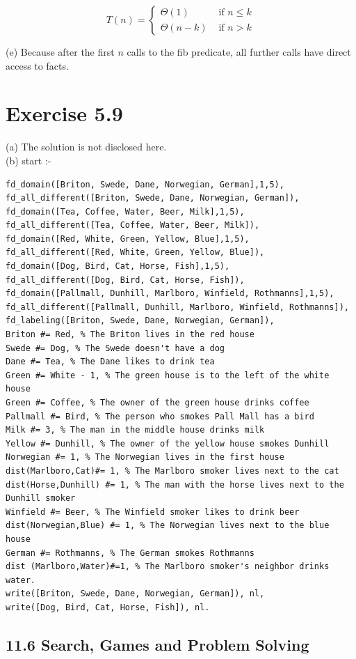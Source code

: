\documentclass[10pt]{article}
\begin{document}
$$
T(n)= \begin{cases}\Theta(1) & \text { if } n \leq k \\ \Theta(n-k) & \text { if } n>k\end{cases}
$$

(e) Because after the first $n$ calls to the fib predicate, all further calls have direct access to facts.

\section*{Exercise 5.9}
(a) The solution is not disclosed here.\\
(b) start :-

\begin{verbatim}
fd_domain([Briton, Swede, Dane, Norwegian, German],1,5),
fd_all_different([Briton, Swede, Dane, Norwegian, German]),
fd_domain([Tea, Coffee, Water, Beer, Milk],1,5),
fd_all_different([Tea, Coffee, Water, Beer, Milk]),
fd_domain([Red, White, Green, Yellow, Blue],1,5),
fd_all_different([Red, White, Green, Yellow, Blue]),
fd_domain([Dog, Bird, Cat, Horse, Fish],1,5),
fd_all_different([Dog, Bird, Cat, Horse, Fish]),
fd_domain([Pallmall, Dunhill, Marlboro, Winfield, Rothmanns],1,5),
fd_all_different([Pallmall, Dunhill, Marlboro, Winfield, Rothmanns]),
fd_labeling([Briton, Swede, Dane, Norwegian, German]),
Briton #= Red, % The Briton lives in the red house
Swede #= Dog, % The Swede doesn't have a dog
Dane #= Tea, % The Dane likes to drink tea
Green #= White - 1, % The green house is to the left of the white house
Green #= Coffee, % The owner of the green house drinks coffee
Pallmall #= Bird, % The person who smokes Pall Mall has a bird
Milk #= 3, % The man in the middle house drinks milk
Yellow #= Dunhill, % The owner of the yellow house smokes Dunhill
Norwegian #= 1, % The Norwegian lives in the first house
dist(Marlboro,Cat)#= 1, % The Marlboro smoker lives next to the cat
dist(Horse,Dunhill) #= 1, % The man with the horse lives next to the Dunhill smoker
Winfield #= Beer, % The Winfield smoker likes to drink beer
dist(Norwegian,Blue) #= 1, % The Norwegian lives next to the blue house
German #= Rothmanns, % The German smokes Rothmanns
dist (Marlboro,Water)#=1, % The Marlboro smoker's neighbor drinks water.
write([Briton, Swede, Dane, Norwegian, German]), nl,
write([Dog, Bird, Cat, Horse, Fish]), nl.
\end{verbatim}

\subsection*{11.6 Search, Games and Problem Solving}
\end{document}
